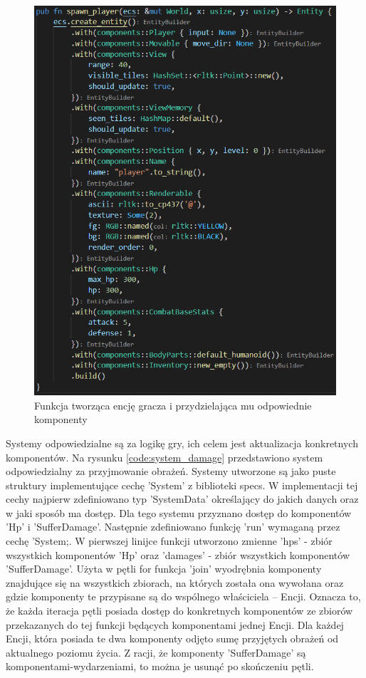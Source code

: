 \documentclass[12pt,twoside]{article}
\begin{document}
\FloatBarrier
\begin{figure}[ht]
	\centering
	\includegraphics[width=12cm]{images/code/spawn_player.png}
	\caption{Funkcja tworząca encję gracza i przydzielająca mu odpowiednie komponenty}
	\label{code:spawn_player}
\end{figure}
\FloatBarrier


Systemy odpowiedzialne są za logikę gry, ich celem jest aktualizacja konkretnych komponentów. Na rysunku \ref{code:system_damage} przedstawiono system odpowiedzialny za przyjmowanie obrażeń. Systemy utworzone są jako puste struktury implementujące cechę 'System' z biblioteki specs. W implementacji tej cechy najpierw zdefiniowano typ 'SystemData' określający do jakich danych oraz w jaki sposób ma dostęp. Dla tego systemu przyznano dostęp do komponentów 'Hp' i 'SufferDamage'. Następnie zdefiniowano funkcję 'run' wymaganą przez cechę 'System;. W pierwszej linijce funkcji utworzono zmienne 'hps' - zbiór wszystkich komponentów 'Hp' oraz 'damages' - zbiór wszystkich komponentów 'SufferDamage'. Użyta w pętli for funkcja 'join' wyodrębnia komponenty znajdujące się na wszystkich zbiorach, na których została ona wywołana oraz gdzie komponenty te przypisane są do wspólnego właściciela -- Encji. Oznacza to, że każda iteracja pętli posiada dostęp do konkretnych komponentów ze zbiorów przekazanych do tej funkcji będących komponentami jednej Encji. Dla każdej Encji, która posiada te dwa komponenty odjęto sumę przyjętych obrażeń od aktualnego poziomu życia. Z racji, że komponenty 'SufferDamage' są komponentami-wydarzeniami, to można je usunąć po skończeniu pętli.
\end{document}
